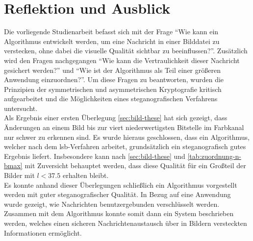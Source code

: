 \chapter{Reflektion und Ausblick}
Die vorliegende Studienarbeit befasst sich mit der Frage \enquote{Wie kann
  ein Algorithmus entwickelt werden, um eine Nachricht
  in einer Bilddatei zu verstecken, ohne dabei die visuelle Qualität sichtbar zu beeinflussen?}.
Zusätzlich wird den Fragen nachgegangen \enquote{Wie kann die Vertraulichkeit dieser Nachricht
  gesichert werden?} und \enquote{Wie ist der Algorithmus als Teil einer
  größeren Anwendung einzuordnen?}. Um diese Fragen zu beantworten, wurden die
Prinzipien der symmetrischen und asymmetrischen Kryptografie kritisch aufgearbeitet
und die Möglichkeiten eines steganografischen Verfahrens untersucht.\\[8pt]
Als Ergebnis einer ersten Überlegung \eqref{sec:bild-these} hat sich gezeigt,
dass Änderungen an einem Bild bis zur viert niederwertigsten Bitstelle im Farbkanal nur
schwer zu erkennen sind. Es wurde hieraus geschlossen, dass ein
Algorithmus, welcher nach dem \acs{lsb}-Verfahren arbeitet,
grundsätzlich ein steganografisch gutes Ergebnis liefert.
Insbesondere kann nach \eqref{sec:bild-these} und \autoref{tab:zuordnung-n-bmax}
mit Zuversicht behauptet werden, dass diese Qualität für
ein Großteil der Bilder mit $l < \num{37.5}$ erhalten bleibt.\\[8pt]
Es konnte anhand dieser Überlegungen schließlich ein Algorithmus vorgestellt werden
mit guter steganografischer Qualität.
In Bezug auf eine Anwendung wurde gezeigt, wie
Nachrichten benutzergebunden verschlüsselt werden.
Zusammen mit dem Algorithmus konnte somit dann ein System beschrieben werden, welches einen
sicheren Nachrichtenaustausch über in Bildern versteckten Informationen ermöglicht.

